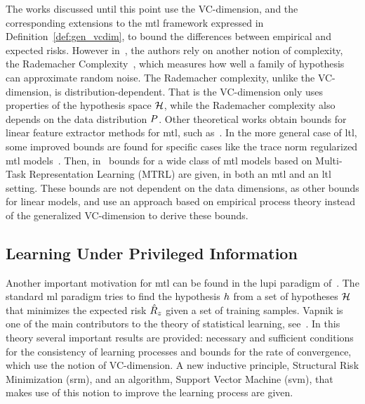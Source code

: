 %
The works discussed until this point use the VC-dimension, and the corresponding extensions to the \acrshort{mtl} framework expressed in Definition~\ref{def:gen_vcdim}, to bound the differences between empirical and expected risks.
%
However in~\cite{AndoZ05}, the authors rely on another notion  of complexity, the Rademacher Complexity~\citep{BartlettM02}, which measures how well a family of hypothesis can approximate random noise. The Rademacher complexity, unlike the VC-dimension, is distribution-dependent. That is the VC-dimension only uses properties of the hypothesis space $\mathcal{H}$, while the Rademacher complexity also depends on the data distribution $P$. 
Other theoretical works obtain bounds for linear feature extractor methods for \acrshort{mtl}, such as~\cite{CavallantiCG10,Maurer06, Maurer06rad}.
In the more general case of \acrshort{ltl}, some improved bounds are found for specific cases like the trace norm regularized \acrshort{mtl} models~\citep{MaurerPR13}.
Then, in~\cite{MaurerPR16} bounds for a wide class of \acrshort{mtl} models based on Multi-Task Representation Learning (MTRL) are given, in both an \acrshort{mtl} and an \acrshort{ltl} setting. These bounds are not dependent on the data dimensions, as other bounds for linear models, and use an approach based on empirical process theory instead of the generalized VC-dimension to derive these bounds.


\subsection{Learning Under Privileged Information}\label{subsec:ch3_lupi}
Another important motivation for \acrshort{mtl} can be found in the \acrfull{lupi} paradigm of~\cite{VapnikI15a}.
The standard \acrshort{ml} paradigm tries to find the hypothesis $h$ from a set of hypotheses $\mathcal{H}$ that minimizes the expected risk $\hat{R}_z$ given a set of training samples.
Vapnik is one of the main contributors to the theory of statistical learning, see~\cite{Vapnik00}. In this theory several important results are provided: necessary and sufficient conditions for the consistency of learning processes and bounds for the rate of convergence, which use the notion of VC-dimension. A new inductive principle, Structural Risk Minimization (\acrshort{srm}), and an algorithm, Support Vector Machine (\acrshort{svm}), that makes use of this notion to improve the learning process are given.


